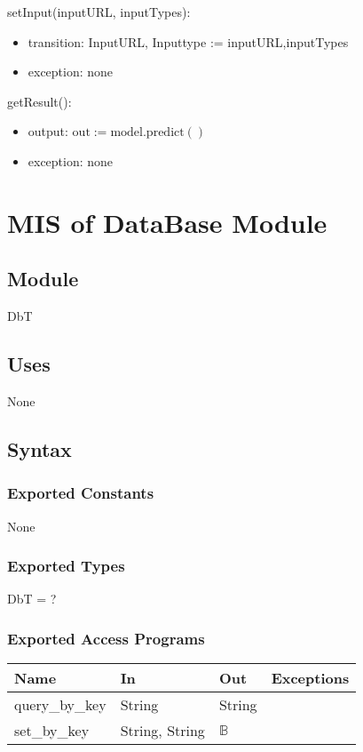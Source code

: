 \documentclass[12pt, titlepage]{article}
\begin{document}
\noindent setInput(inputURL, inputTypes):
\begin{itemize}
\item transition: InputURL, Inputtype := inputURL,inputTypes
\item exception: none
\end{itemize}

\noindent getResult():
\begin{itemize}
    \item output: $\text{out} := \text{model}.\text{predict}()$
    \item exception: none
\end{itemize}

\newpage

\section{MIS of DataBase Module} 
\label{DB:Module}

\subsection{Module}
DbT

\subsection{Uses}
None

\subsection{Syntax}

\subsubsection{Exported Constants}
None

\subsubsection{Exported Types}
DbT = ?

\subsubsection{Exported Access Programs}

\begin{tabular}{p{4cm} p{4cm} p{2cm} p{4cm}}
\hline
\textbf{Name} & \textbf{In} & \textbf{Out} & \textbf{Exceptions} \\
\hline
query\_by\_key & String & String &  \\
set\_by\_key & String, String & $\mathbb{B}$\\
\hline
\end{tabular}
\end{document}
